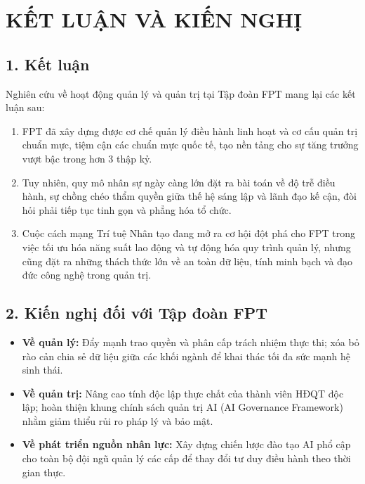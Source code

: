 \section*{KẾT LUẬN VÀ KIẾN NGHỊ}

\subsection*{1. Kết luận}
Nghiên cứu về hoạt động quản lý và quản trị tại Tập đoàn FPT mang lại các kết luận sau:
\begin{enumerate}
    \item FPT đã xây dựng được cơ chế quản lý điều hành linh hoạt và cơ cấu quản trị chuẩn mực, tiệm cận các chuẩn mực quốc tế, tạo nền tảng cho sự tăng trưởng vượt bậc trong hơn 3 thập kỷ.
    \item Tuy nhiên, quy mô nhân sự ngày càng lớn đặt ra bài toán về độ trễ điều hành, sự chồng chéo thẩm quyền giữa thế hệ sáng lập và lãnh đạo kế cận, đòi hỏi phải tiếp tục tinh gọn và phẳng hóa tổ chức.
    \item Cuộc cách mạng Trí tuệ Nhân tạo đang mở ra cơ hội đột phá cho FPT trong việc tối ưu hóa năng suất lao động và tự động hóa quy trình quản lý, nhưng cũng đặt ra những thách thức lớn về an toàn dữ liệu, tính minh bạch và đạo đức công nghệ trong quản trị.
\end{enumerate}

\subsection*{2. Kiến nghị đối với Tập đoàn FPT}
\begin{itemize}
    \item \textbf{Về quản lý:} Đẩy mạnh trao quyền và phân cấp trách nhiệm thực thi; xóa bỏ rào cản chia sẻ dữ liệu giữa các khối ngành để khai thác tối đa sức mạnh hệ sinh thái.
    \item \textbf{Về quản trị:} Nâng cao tính độc lập thực chất của thành viên HĐQT độc lập; hoàn thiện khung chính sách quản trị AI (AI Governance Framework) nhằm giảm thiểu rủi ro pháp lý và bảo mật.
    \item \textbf{Về phát triển nguồn nhân lực:} Xây dựng chiến lược đào tạo AI phổ cập cho toàn bộ đội ngũ quản lý các cấp để thay đổi tư duy điều hành theo thời gian thực.
\end{itemize}
